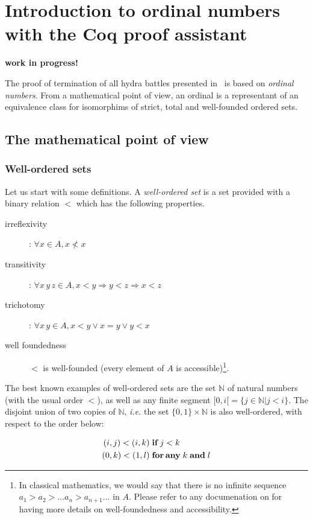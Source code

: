 \chapter{Introduction to ordinal numbers with the Coq proof assistant}

\centerline{\LARGE {\bf work in progress!}}


The proof of termination of all hydra battles presented in~\cite{KP82} is based
on \emph{ordinal numbers}.
From a mathematical point of view, an ordinal is a representant of an equivalence class for isomorphims of strict, total and well-founded ordered sets.

\section{The mathematical point of view}

\subsection{Well-ordered sets}
Let us start with some definitions.
A  \emph{well-ordered set} is a set provided with a binary relation $<$ which has the following properties.
\begin{description}
\item[irreflexivity] : $\forall x\in A, x\not< x$
\item[transitivity] : $\forall x\,y\,z\in A, x<y \Rightarrow y<z \Rightarrow x<z$
\item[trichotomy]: $\forall x\,y\in A, x<y \vee x = y \vee y < x$
\item[well foundedness] $<$ is well-founded (every element of $A$ is accessible)\footnote{In classical mathematics, we would say that there is no infinite sequence $a_1>a_2> \dots a_n> a_{n+1}\dots$ in $A$. Please refer to any documenation on \coq{} for having more details on well-foundedness and accessibility.}.

\end{description}

The best known examples of well-ordered sets are the set $\mathbb{N}$ of natural numbers (with the usual order $<$), as well as any finite segment $[0,i[=\{j\in\mathbb{N}|j<i\}$.
The disjoint union of two copies of $\mathbb{N}$, \emph{i.e.} the set $\{0,1\}\times\mathbb{N}$ is also well-ordered,
with respect to the order below:

\begin{align*}
(i,j) < (i,k) & \;\textbf{if} \; j < k\\
(0,k) < (1,l) & \;\textbf{for\,any}\;k \;\textbf{and} \; l
\end{align*}

